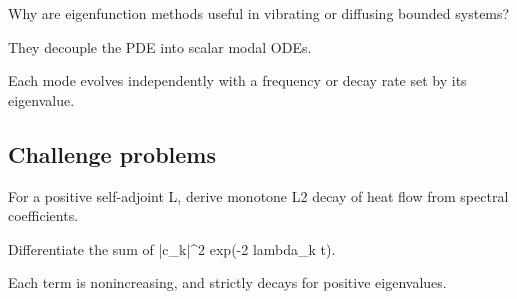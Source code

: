 \begin{exercise}\label{exr:iii28-expand-14}
Why are eigenfunction methods useful in vibrating or diffusing bounded systems?
\end{exercise}
\begin{hint}
They decouple the PDE into scalar modal ODEs.
\end{hint}
\begin{solution}
Each mode evolves independently with a frequency or decay rate set by its eigenvalue.
\end{solution}

\subsection*{Challenge problems}

\begin{exercise}\label{exr:iii28-expand-15}
For a positive self-adjoint L, derive monotone L2 decay of heat flow from spectral coefficients.
\end{exercise}
\begin{hint}
Differentiate the sum of |c\_k|\textasciicircum{}2 exp(-2 lambda\_k t).
\end{hint}
\begin{solution}
Each term is nonincreasing, and strictly decays for positive eigenvalues.
\end{solution}

